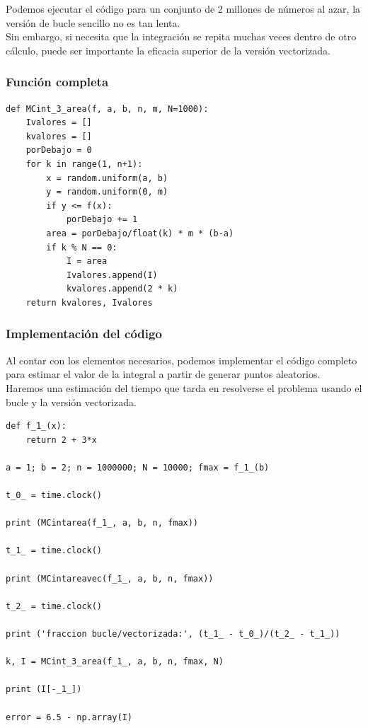 \begin{frame}
Podemos ejecutar el código para un conjunto de 2 millones de números al azar, la versión de bucle sencillo no es tan lenta.
\\
\bigskip
Sin embargo, si necesita que la integración se repita muchas veces dentro de otro cálculo, puede ser importante la eficacia superior de la versión vectorizada.
\end{frame}
\begin{frame}
\frametitle{Función completa}
\begin{lstlisting}[caption=Función para el método del dardo, style=FormattedNumber, basicstyle=\linespread{1.1}\ttfamily=\small, columns=fullflexible]
def MCint_3_area(f, a, b, n, m, N=1000):
    Ivalores = []
    kvalores = []
    porDebajo = 0
    for k in range(1, n+1):
        x = random.uniform(a, b)
        y = random.uniform(0, m)
        if y <= f(x):
            porDebajo += 1
        area = porDebajo/float(k) * m * (b-a)
        if k % N == 0:
            I = area
            Ivalores.append(I)
            kvalores.append(2 * k)
    return kvalores, Ivalores
\end{lstlisting}
\end{frame}
\begin{frame}
\frametitle{Implementación del código}
Al contar con los elementos necesarios, podemos implementar el código completo para estimar el valor de la integral a partir de generar puntos aleatorios.
\\
\bigskip
Haremos una estimación del tiempo que tarda en resolverse el problema usando el bucle y la versión vectorizada.
\end{frame}
\begin{frame}
\begin{lstlisting}[caption=Implementación del código, style=FormattedNumber, basicstyle=\linespread{1.1}\ttfamily=\small, columns=fullflexible]
def f_1_(x):
    return 2 + 3*x

a = 1; b = 2; n = 1000000; N = 10000; fmax = f_1_(b)

t_0_ = time.clock()

print (MCintarea(f_1_, a, b, n, fmax))

t_1_ = time.clock()

print (MCintareavec(f_1_, a, b, n, fmax))

t_2_ = time.clock()

print ('fraccion bucle/vectorizada:', (t_1_ - t_0_)/(t_2_ - t_1_))

k, I = MCint_3_area(f_1_, a, b, n, fmax, N)

print (I[-_1_])

error = 6.5 - np.array(I)
\end{lstlisting}
\end{frame}
